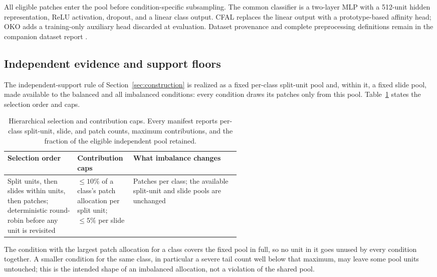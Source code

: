 \documentclass[11pt]{article}
\begin{document}
All eligible patches enter the pool before condition-specific subsampling. The common classifier is a two-layer MLP with a 512-unit hidden representation, ReLU activation, dropout, and a linear class output. CFAL replaces the linear output with a prototype-based affinity head; OKO adds a training-only auxiliary head discarded at evaluation. Dataset provenance and complete preprocessing definitions remain in the companion dataset report \citep{queisler2026datasets}.

\subsection{Independent evidence and support floors}
\label{app:construction-support}
The independent-support rule of Section~\ref{sec:construction} is realized as a fixed per-class split-unit pool and, within it, a fixed slide pool, made available to the balanced and all imbalanced conditions: every condition draws its patches only from this pool. Table~\ref{tab:support-rules} states the selection order and caps.

\begin{table}[ht]
  \centering
  \footnotesize
  \begin{tabularx}{\linewidth}{@{}>{\raggedright\arraybackslash}p{0.30\linewidth}>{\raggedright\arraybackslash}p{0.24\linewidth}X@{}}
    \toprule
    Selection order & Contribution caps & What imbalance changes \\
    \midrule
    Split units, then slides within units, then patches; deterministic round-robin before any unit is revisited & $\leq10\%$ of a class's patch allocation per split unit; $\leq5\%$ per slide & Patches per class; the available split-unit and slide pools are unchanged \\
    \bottomrule
  \end{tabularx}
  \caption{Hierarchical selection and contribution caps. Every manifest reports per-class split-unit, slide, and patch counts, maximum contributions, and the fraction of the eligible independent pool retained.}
  \label{tab:support-rules}
\end{table}

\noindent The condition with the largest patch allocation for a class covers the fixed pool in full, so no unit in it goes unused by every condition together. A smaller condition for the same class, in particular a severe tail count well below that maximum, may leave some pool units untouched; this is the intended shape of an imbalanced allocation, not a violation of the shared pool.
\end{document}
